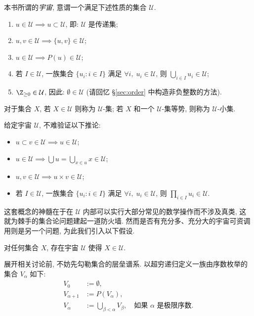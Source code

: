 \begin{definition}
	本书所谓的\emph{宇宙}, 意谓一个满足下述性质的集合 $\mathcal{U}$.
	\begin{enumerate}[\bfseries {U}.1]
		\item $u \in \mathcal{U} \implies u \subset \mathcal{U}$, 即: $\mathcal{U}$ 是传递集;
		\item $u,v \in \mathcal{U} \implies \{u, v\} \in \mathcal{U}$;
		\item $u \in \mathcal{U} \implies P(u) \in \mathcal{U}$;
		\item 若 $I \in \mathcal{U}$, 一族集合 $\{u_i : i \in I\}$ 满足 $\forall i, \; u_i \in \mathcal{U}$, 则 $\bigcup_{i \in I} u_i \in \mathcal{U}$;
		\item $\Z_{\geq 0} \in \mathcal{U}$, 因此: $\emptyset \in \mathcal{U}$ (请回忆 \S\ref{sec:order} 中构造非负整数的方法).
	\end{enumerate}
	对于集合 $X$, 若 $X \in \mathcal{U}$ 则称为 $\mathcal{U}$-集; 若 $X$ 和一个 $\mathcal{U}$-集等势, 则称为 $\mathcal{U}$-小集.
\end{definition}

给定宇宙 $\mathcal{U}$, 不难验证以下推论:
\begin{itemize}
	\item $u \subset v \in \mathcal{U} \implies u \in \mathcal{U}$;
	\item $u \in \mathcal{U} \implies \bigcup u = \bigcup_{x \in u} x  \in \mathcal{U}$;
	\item $u, v \in \mathcal{U} \implies u \times v \in \mathcal{U}$;
	\item 若 $I \in \mathcal{U}$, 一族集合 $\{u_i : i \in I\}$ 满足 $\forall i, \; u_i \in \mathcal{U}$, 则 $\prod_{i \in I} u_i \in \mathcal{U}$.
\end{itemize}

这套概念的神髓在于在 $\mathcal{U}$ 内部可以实行大部分常见的数学操作而不涉及真类, 这就为棘手的集合论问题建起一道防火墙. 然而是否有充分多、充分大的宇宙可资调用则是另一个问题, 为此我们引入以下假设.

\begin{hypothesis}[A.\ Grothendieck]\label{hyp:universe}
	对任何集合 $X$, 存在宇宙 $\mathcal{U}$ 使得 $X \in \mathcal{U}$.
\end{hypothesis}

展开相关讨论前, 不妨先勾勒集合的层垒谱系. 以超穷递归定义一族由序数枚举的集合 $V_\alpha$ 如下: 
\begin{align*}
	V_0 & := \emptyset, \\
	V_{\alpha+1} & := P(V_\alpha), \\
	V_\alpha & :=\bigcup_{\beta < \alpha} V_\beta, \quad \text{如果 $\alpha$ 是极限序数}.
\end{align*}

